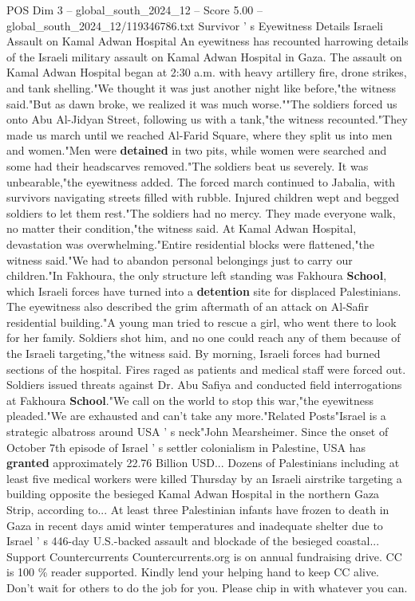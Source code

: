 \begin{textsample}{POS Dim 3 – global\_south\_2024\_12 – Score 5.00 – global\_south\_2024\_12/119346786.txt}
Survivor ' s Eyewitness Details Israeli Assault on Kamal Adwan Hospital An eyewitness has recounted harrowing details of the Israeli military assault on Kamal Adwan Hospital in Gaza.
The assault on Kamal Adwan Hospital began at 2:30 a.m. with heavy artillery fire, drone strikes, and tank shelling."We thought it was just another night like before,"the witness said."But as dawn broke, we realized it was much worse.""The soldiers forced us onto Abu Al-Jidyan Street, following us with a tank,"the witness recounted."They made us march until we reached Al-Farid Square, where they split us into men and women."Men were \textbf{detained} in two pits, while women were searched and some had their headscarves removed."The soldiers beat us severely.
It was unbearable,"the eyewitness added.
The forced march continued to Jabalia, with survivors navigating streets filled with rubble.
Injured children wept and begged soldiers to let them rest."The soldiers had no mercy.
They made everyone walk, no matter their condition,"the witness said.
At Kamal Adwan Hospital, devastation was overwhelming."Entire residential blocks were flattened,"the witness said."We had to abandon personal belongings just to carry our children."In Fakhoura, the only structure left standing was Fakhoura \textbf{School}, which Israeli forces have turned into a \textbf{detention} site for displaced Palestinians.
The eyewitness also described the grim aftermath of an attack on Al-Safir residential building."A young man tried to rescue a girl, who went there to look for her family.
Soldiers shot him, and no one could reach any of them because of the Israeli targeting,"the witness said.
By morning, Israeli forces had burned sections of the hospital.
Fires raged as patients and medical staff were forced out.
Soldiers issued threats against Dr.
Abu Safiya and conducted field interrogations at Fakhoura \textbf{School}."We call on the world to stop this war,"the eyewitness pleaded."We are exhausted and can't take any more."Related Posts"Israel is a strategic albatross around USA ' s neck"John Mearsheimer.
Since the onset of October 7th episode of Israel ' s settler colonialism in Palestine, USA has \textbf{granted} approximately 22.76 Billion USD...
Dozens of Palestinians including at least five medical workers were killed Thursday by an Israeli airstrike targeting a building opposite the besieged Kamal Adwan Hospital in the northern Gaza Strip, according to...
At least three Palestinian infants have frozen to death in Gaza in recent days amid winter temperatures and inadequate shelter due to Israel ' s 446-day U.S.-backed assault and blockade of the besieged coastal...
Support Countercurrents Countercurrents.org is on annual fundraising drive.
CC is 100 \% reader supported.
Kindly lend your helping hand to keep CC alive.
Don't wait for others to do the job for you.
Please chip in with whatever you can.

\end{textsample}
